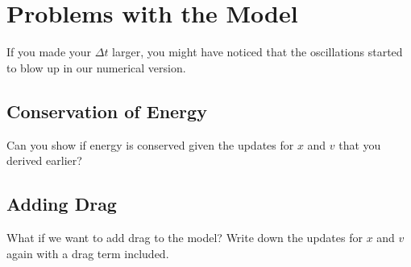 \documentclass[11pt]{article}
\begin{document}
\section{Problems with the Model}
If you made your $\Delta t$ larger, you might have noticed that the oscillations started to blow up in our numerical version.
\subsection{Conservation of Energy}
Can you show if energy is conserved given the updates for $x$ and $v$ that you derived earlier?
\subsection{Adding Drag}
What if we want to add drag to the model? Write down the updates for $x$ and $v$ again with a drag term included.
\end{document}
